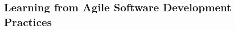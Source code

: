 














\subsection{Learning from Agile Software Development Practices} %
\label{sub:learning_from_agile_software_development_practices}


